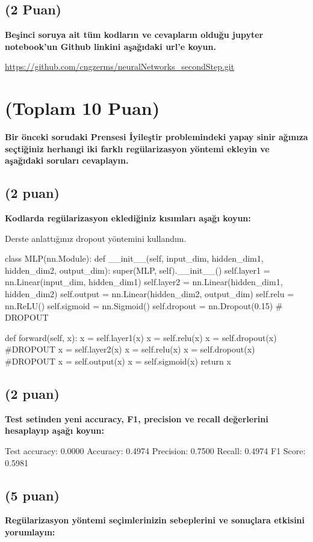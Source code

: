 \documentclass[11pt]{article}
\begin{document}
\subsection{(2 Puan)} \textbf{Beşinci soruya ait tüm kodların ve cevapların olduğu jupyter notebook'un Github linkini aşağıdaki url'e koyun.}

\url{https://github.com/cngzerms/neuralNetworks_secondStep.git}

\section{(Toplam 10 Puan)} \textbf{Bir önceki sorudaki Prensesi İyileştir problemindeki yapay sinir ağınıza seçtiğiniz herhangi iki farklı regülarizasyon yöntemi ekleyin ve aşağıdaki soruları cevaplayın.} 

\subsection{(2 puan)} \textbf{Kodlarda regülarizasyon eklediğiniz kısımları aşağı koyun:} 

Derste anlattığınız dropout yöntemini kullandım.

\begin{python}
class MLP(nn.Module):
    def __init__(self, input_dim, hidden_dim1, hidden_dim2, output_dim):
        super(MLP, self).__init__()
        self.layer1 = nn.Linear(input_dim, hidden_dim1)
        self.layer2 = nn.Linear(hidden_dim1, hidden_dim2)
        self.output = nn.Linear(hidden_dim2, output_dim)
        self.relu = nn.ReLU()
        self.sigmoid = nn.Sigmoid()
        self.dropout = nn.Dropout(0.15) # DROPOUT
        
    def forward(self, x):
        x = self.layer1(x)
        x = self.relu(x)
        x = self.dropout(x)   #DROPOUT
        x = self.layer2(x)
        x = self.relu(x)
        x = self.dropout(x)   #DROPOUT
        x = self.output(x)
        x = self.sigmoid(x)
        return x
\end{python}

\subsection{(2 puan)} \textbf{Test setinden yeni accuracy, F1, precision ve recall değerlerini hesaplayıp aşağı koyun:}

Test accuracy: 0.0000
Accuracy: 0.4974
Precision: 0.7500
Recall: 0.4974
F1 Score: 0.5981

\subsection{(5 puan)} \textbf{Regülarizasyon yöntemi seçimlerinizin sebeplerini ve sonuçlara etkisini yorumlayın:}
\end{document}
